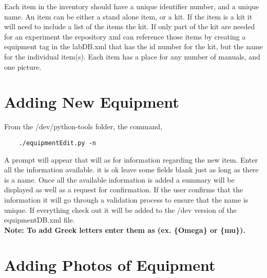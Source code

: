 \documentclass[justified]{LabArx1_5}
\begin{document}
Each item in the inventory should have a unique identifier number, and a unique name. An item can be either a stand alone item, or a kit. If the item is a kit it will need to include a list of the items the kit. If only part of the kit are needed for an experiment the repository xml can reference those items by creating a equipment tag in the labDB.xml that has the id number for the kit, but the name for the individual item(s). Each item has a place for any number of manuals, and one picture.\\



\section{Adding New Equipment}


From the /dev/python-tools folder, the command,

	\begin{lstlisting}
	./equipmentEdit.py -n       
	\end{lstlisting}

A prompt will appear that will as for information regarding the new item. Enter all the information available. it is ok leave some fields blank just as long as there is a name. Once all the available information is added a summary will be displayed as well as a request for confirmation. If the user confirms that the information it will go through a validation process to ensure that the name is unique. If everything check out it will be added to the /dev version of the equipmentDB.xml file.\\

{\bf Note: To add Greek letters enter them as (ex. \{Omega\} or \{mu\}).}




\section{Adding Photos of Equipment}
\end{document}
